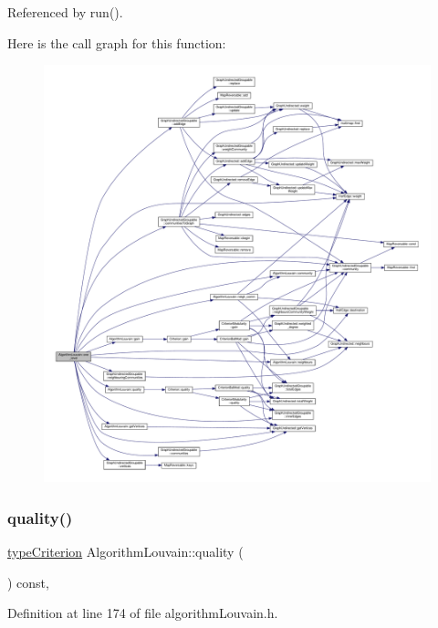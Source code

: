 Referenced by run().

Here is the call graph for this function\+:
\nopagebreak
\begin{figure}[H]
\begin{center}
\leavevmode
\includegraphics[width=350pt]{classAlgorithmLouvain_a5370c76e777b7cbfddd1dccd865d9356_cgraph}
\end{center}
\end{figure}
\mbox{\label{classAlgorithmLouvain_a8c9b7694fff17eb5d8044cd26d7914e7}} 
\subsubsection{\texorpdfstring{quality()}{quality()}}
{\footnotesize\ttfamily \hyperlink{criterionInterface_8h_af71ff22f6355fd69a4a62104bfd59a83}{type\+Criterion} Algorithm\+Louvain\+::quality (\begin{DoxyParamCaption}{ }\end{DoxyParamCaption}) const\hspace{0.3cm}{\ttfamily [inline]}, {\ttfamily [private]}}



Definition at line 174 of file algorithm\+Louvain.\+h.



